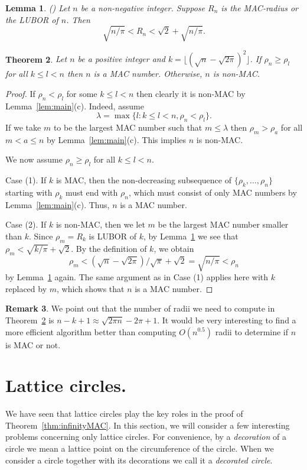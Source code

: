 \documentclass{article}
\theoremstyle{theorem}
\newtheorem{theorem}{Theorem}
\newtheorem{lemma}[theorem]{Lemma}
\theoremstyle{definition}
\newtheorem{remark}[theorem]{Remark}
\begin{document}
\begin{lemma}\label{lem:Rbound}  \emph{(\cite[Theorem 9]{Zhao2025Aug})}
Let $n$ be a non-negative integer. Suppose $R_n$ is the MAC-radius or the LUBOR of $n$. Then $$\sqrt{n/\pi}<R_n<\sqrt{2}+\sqrt{n/\pi}.$$
\end{lemma}

\begin{theorem}\label{thm:effAlgorithm}
Let $n$ be a positive integer and $k=\lfloor (\sqrt{n}-\sqrt{2\pi})^2 \rfloor$. If
$ \rho_n\ge \rho_l$ for all $k\le l<n$ then $n$ is a MAC number. Otherwise, $n$ is non-MAC.
\end{theorem}

\begin{proof} If $\rho_n<\rho_l$ for some $k\le l<n$ then clearly it is non-MAC by Lemma~\ref{lem:main}(c). Indeed,
assume
\begin{equation*}
   \lambda=\max\{l: k\le l<n, \rho_n<\rho_l\}.
\end{equation*}
If we take $m$ to be the largest MAC number such that $m\le \lambda$ then $\rho_m>\rho_a$ for all $m<a\le n$ by Lemma~\ref{lem:main}(c).
This implies $n$ is non-MAC.

We now assume $\rho_n\ge \rho_l$ for all $k\le l<n$.

Case (1). If $k$ is MAC, then the non-decreasing subsequence of $\{\rho_k,\dots,\rho_n\}$ starting with $\rho_k$ must end with $\rho_n$, which must consist of only MAC numbers by Lemma~\ref{lem:main}(c). Thus, $n$ is a MAC number.

Case (2). If $k$ is non-MAC, then we let $m$ be the largest MAC number smaller than $k$. Since $\rho_m=R_k$ is LUBOR of $k$, by Lemma~\ref{lem:Rbound} we see that $\rho_m<\sqrt{k/\pi}+\sqrt{2}$. By the definition of $k$, we obtain
$$
\rho_m<(\sqrt{n}-\sqrt{2\pi})/\sqrt{\pi}+\sqrt{2}=\sqrt{n/\pi}<\rho_n
$$
by Lemma~\ref{lem:Rbound} again. The same argument as in Case (1) applies here with $k$ replaced by $m$, which shows that $n$ is a MAC number.
\end{proof}


\begin{remark}\label{rem:smallSetRadii}
We point out that the number of radii we need to compute in Theorem~\ref{thm:effAlgorithm} is $n-k+1\approx \sqrt{2\pi n}-2\pi+1$.
It would be very interesting to find a more efficient algorithm better than computing $O(n^{0.5})$ radii to determine if $n$ is MAC or not.
\end{remark}


\section{Lattice circles.}\label{sec:latCircle}
We have seen that lattice circles play the key roles in the proof of Theorem~\ref{thm:infinityMAC}. In this section, we will consider a few interesting problems concerning only lattice circles. For convenience, by a \emph{decoration} of a circle we mean a lattice point on the circumference of the circle. When we consider a circle together with its decorations we call it a \emph{decorated circle}.
\end{document}
